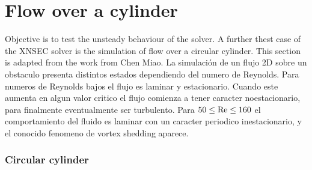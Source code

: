 \section{Flow over a cylinder}
Objective is to test the unsteady behaviour of the solver.
A further thest case of the XNSEC solver is the simulation of flow over a circular cylinder. This section is adapted from the work from Chen Miao. %
La simulación de un flujo 2D sobre un obstaculo presenta distintos estados dependiendo del numero de Reynolds. Para numeros de Reynolds bajos el flujo es laminar y estacionario. Cuando este aumenta en algun valor critico el flujo comienza a tener caracter noestacionario, para finalmente eventualmente ser turbulento. Para $50 \leq \text{Re} \leq 160$ el comportamiento del fluido es laminar con un caracter periodico inestacionario, y el conocido fenomeno de vortex shedding aparece. \cite{sharmaHEATFLUIDFLOW2004}
\subsubsection{Circular cylinder}

